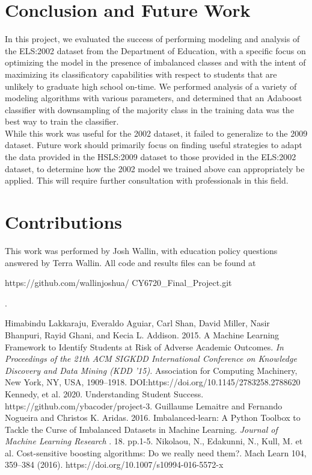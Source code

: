 \documentclass[conference]{IEEEtran}
\begin{document}
\section{Conclusion and Future Work}

In this project, we evaluated the success of performing modeling and analysis of the ELS:2002 dataset from the Department of Education, with a specific focus on optimizing the model in the presence of imbalanced classes and with the intent of maximizing its classificatory capabilities with respect to students that are unlikely to graduate high school on-time. We performed analysis of a variety of modeling algorithms with various parameters, and determined that an Adaboost classifier with downsampling of the majority class in the training data was the best way to train the classifier.\\

While this work was useful for the 2002 dataset, it failed to generalize to the 2009 dataset. Future work should primarily focus on finding useful strategies to adapt the data provided in the HSLS:2009 dataset to those provided in the ELS:2002 dataset, to determine how the 2002 model we trained above can appropriately be applied. This will require further consultation with professionals in this field.

\section*{Contributions}
This work was performed by Josh Wallin, with education policy questions answered by Terra Wallin. All code and results files can be found at 
\begin{verbatim*}
https://github.com/wallinjoshua/
CY6720_Final_Project.git
\end{verbatim*}.\\

\begin{thebibliography}{00}
 Himabindu Lakkaraju, Everaldo Aguiar, Carl Shan, David Miller, Nasir Bhanpuri, Rayid Ghani, and Kecia L.
Addison. 2015. A Machine Learning Framework to Identify Students at Risk of Adverse Academic Outcomes. \textit{In
Proceedings of the 21th ACM SIGKDD International Conference on Knowledge Discovery and Data Mining (KDD '15).}
Association for Computing Machinery, New York, NY, USA, 1909–1918. DOI:https://doi.org/10.1145/2783258.2788620
 Kennedy, et al. 2020. Understanding Student Success. https://github.com/ybacoder/project-3.
 Guillaume Lemaitre and Fernando Nogueira and Christos K. Aridas. 2016. Imbalanced-learn: A Python Toolbox to Tackle the Curse of Imbalanced Datasets in Machine Learning. \textit{Journal of Machine Learning Research }. 18. pp.1-5. 
 Nikolaou, N., Edakunni, N., Kull, M. et al. Cost-sensitive boosting algorithms: Do we really need them?. Mach Learn 104, 359–384 (2016). https://doi.org/10.1007/s10994-016-5572-x
\end{thebibliography}
\vspace{12pt}
\end{document}
